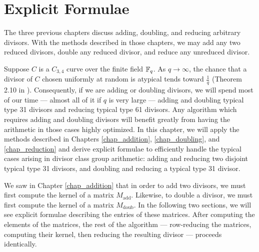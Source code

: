 
\section{Explicit Formulae}
\label{chap_typical_case}

The three previous chapters discuss adding, doubling, and reducing arbitrary divisors.
With the methods described in those chapters, we may add any two reduced divisors,
double any reduced divisor, and reduce any unreduced divisor.

Suppose $C$ is a $C_{3,4}$ curve over the finite field $\mathbb{F}_q$.
As $q \to \infty$, the chance that a divisor of $C$ chosen uniformly at random is atypical
tends toward $\frac 1 q$ (Theorem 2.10 in \cite{kmakdisi18}).
Consequently, if we are adding or doubling divisors,
we will spend most of our time ---
almost all of it if $q$ is very large ---
adding and doubling typical type 31 divisors and reducing typical type 61 divisors.
Any algorithm which requires adding and doubling divisors will benefit greatly from
having the arithmetic in those cases highly optimized.
In this chapter, we will apply the methods described in
Chapters \ref{chap_addition}, \ref{chap_doubling}, and \ref{chap_reduction}
and derive explicit formulae to efficiently handle
the typical cases arising in divisor class group arithmetic:
adding and reducing two disjoint typical type 31 divisors,
and doubling and reducing a typical type 31 divisor.

We saw in Chapter \ref{chap_addition} that in order to add two divisors,
we must first compute the kernel of a matrix $M_{\text{add}}$.
Likewise, to double a divisor, we must first compute the kernel of a matrix $M_{\text{doub}}$.
In the following two sections, we will see explicit formulae describing the entries of these matrices.
After computing the elements of the matrices,
the rest of the algorithm ---
row-reducing the matrices, computing their kernel, then reducing the resulting divisor ---
proceeds identically.

